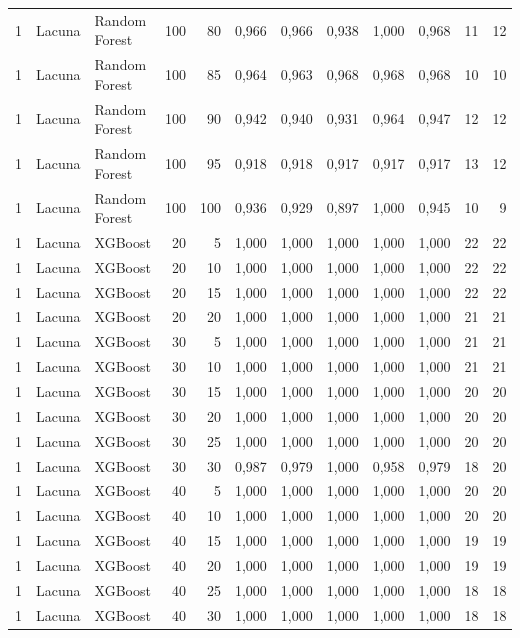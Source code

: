 \begin{longtable}{@{}rllrrrrrrrrr@{}}
1 & Lacuna & Random Forest & 100 & 80 & 0,966 & 0,966 & 0,938 & 1,000 & 0,968 & 11 & 12 \\
1 & Lacuna & Random Forest & 100 & 85 & 0,964 & 0,963 & 0,968 & 0,968 & 0,968 & 10 & 10 \\
1 & Lacuna & Random Forest & 100 & 90 & 0,942 & 0,940 & 0,931 & 0,964 & 0,947 & 12 & 12 \\
1 & Lacuna & Random Forest & 100 & 95 & 0,918 & 0,918 & 0,917 & 0,917 & 0,917 & 13 & 12 \\
1 & Lacuna & Random Forest & 100 & 100 & 0,936 & 0,929 & 0,897 & 1,000 & 0,945 & 10 & 9 \\
1 & Lacuna & XGBoost & 20 & 5 & 1,000 & 1,000 & 1,000 & 1,000 & 1,000 & 22 & 22 \\
1 & Lacuna & XGBoost & 20 & 10 & 1,000 & 1,000 & 1,000 & 1,000 & 1,000 & 22 & 22 \\
1 & Lacuna & XGBoost & 20 & 15 & 1,000 & 1,000 & 1,000 & 1,000 & 1,000 & 22 & 22 \\
1 & Lacuna & XGBoost & 20 & 20 & 1,000 & 1,000 & 1,000 & 1,000 & 1,000 & 21 & 21 \\
1 & Lacuna & XGBoost & 30 & 5 & 1,000 & 1,000 & 1,000 & 1,000 & 1,000 & 21 & 21 \\
1 & Lacuna & XGBoost & 30 & 10 & 1,000 & 1,000 & 1,000 & 1,000 & 1,000 & 21 & 21 \\
1 & Lacuna & XGBoost & 30 & 15 & 1,000 & 1,000 & 1,000 & 1,000 & 1,000 & 20 & 20 \\
1 & Lacuna & XGBoost & 30 & 20 & 1,000 & 1,000 & 1,000 & 1,000 & 1,000 & 20 & 20 \\
1 & Lacuna & XGBoost & 30 & 25 & 1,000 & 1,000 & 1,000 & 1,000 & 1,000 & 20 & 20 \\
1 & Lacuna & XGBoost & 30 & 30 & 0,987 & 0,979 & 1,000 & 0,958 & 0,979 & 18 & 20 \\
1 & Lacuna & XGBoost & 40 & 5 & 1,000 & 1,000 & 1,000 & 1,000 & 1,000 & 20 & 20 \\
1 & Lacuna & XGBoost & 40 & 10 & 1,000 & 1,000 & 1,000 & 1,000 & 1,000 & 20 & 20 \\
1 & Lacuna & XGBoost & 40 & 15 & 1,000 & 1,000 & 1,000 & 1,000 & 1,000 & 19 & 19 \\
1 & Lacuna & XGBoost & 40 & 20 & 1,000 & 1,000 & 1,000 & 1,000 & 1,000 & 19 & 19 \\
1 & Lacuna & XGBoost & 40 & 25 & 1,000 & 1,000 & 1,000 & 1,000 & 1,000 & 18 & 18 \\
1 & Lacuna & XGBoost & 40 & 30 & 1,000 & 1,000 & 1,000 & 1,000 & 1,000 & 18 & 18 \\

\end{longtable}
